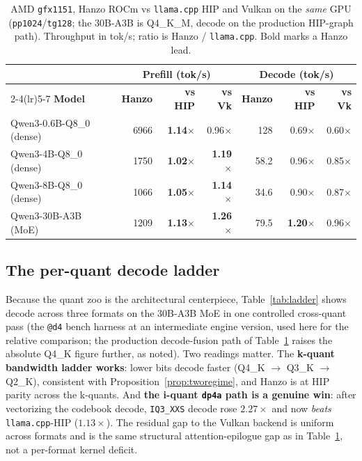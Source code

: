 \documentclass[11pt]{article}
\begin{document}
\begin{table}[t]
\centering
\caption{AMD \texttt{gfx1151}, Hanzo ROCm vs \texttt{llama.cpp} HIP and Vulkan on the \emph{same}
GPU (\texttt{pp1024}/\texttt{tg128}; the $30$B-A3B is Q4\_K\_M, decode on the production HIP-graph
path). Throughput in tok/s; ratio is Hanzo / \texttt{llama.cpp}. Bold marks a Hanzo lead.}
\label{tab:amd}
\begin{tabular}{l rrr rrr}
\toprule
& \multicolumn{3}{c}{\textbf{Prefill (tok/s)}} & \multicolumn{3}{c}{\textbf{Decode (tok/s)}} \\
\cmidrule(lr){2-4}\cmidrule(lr){5-7}
\textbf{Model} & \textbf{Hanzo} & \textbf{vs HIP} & \textbf{vs Vk} & \textbf{Hanzo} & \textbf{vs HIP} & \textbf{vs Vk} \\
\midrule
Qwen3-0.6B-Q8\_0 (dense)   & 6966 & \textbf{1.14$\times$} & 0.96$\times$           & 128  & 0.69$\times$          & 0.60$\times$ \\
Qwen3-4B-Q8\_0 (dense)     & 1750 & \textbf{1.02$\times$} & \textbf{1.19$\times$}  & 58.2 & 0.96$\times$          & 0.85$\times$ \\
Qwen3-8B-Q8\_0 (dense)     & 1066 & \textbf{1.05$\times$} & \textbf{1.14$\times$}  & 34.6 & 0.90$\times$          & 0.87$\times$ \\
Qwen3-30B-A3B (MoE)        & 1209 & \textbf{1.13$\times$} & \textbf{1.26$\times$}  & 79.5 & \textbf{1.20$\times$} & 0.96$\times$ \\
\bottomrule
\end{tabular}
\end{table}

\subsection{The per-quant decode ladder}
\label{sec:ladder}

Because the quant zoo is the architectural centerpiece, Table~\ref{tab:ladder} shows decode across
three formats on the $30$B-A3B MoE in one controlled cross-quant pass (the \texttt{@d4} bench harness
at an intermediate engine version, used here for the relative comparison; the production decode-fusion
path of Table~\ref{tab:amd} raises the absolute Q4\_K figure further, as noted). Two readings matter.
The \textbf{k-quant bandwidth ladder works}: lower bits decode faster (Q4\_K $\to$ Q3\_K $\to$ Q2\_K),
consistent with Proposition~\ref{prop:tworegime}, and Hanzo is at HIP parity across the k-quants. And
\textbf{the i-quant \texttt{dp4a} path is a genuine win}: after vectorizing the codebook decode,
\texttt{IQ3\_XXS} decode rose $2.27\times$ and now \emph{beats} \texttt{llama.cpp}-HIP ($1.13\times$).
The residual gap to the Vulkan backend is uniform across formats and is the same structural
attention-epilogue gap as in Table~\ref{tab:amd}, not a per-format kernel deficit.
\end{document}
